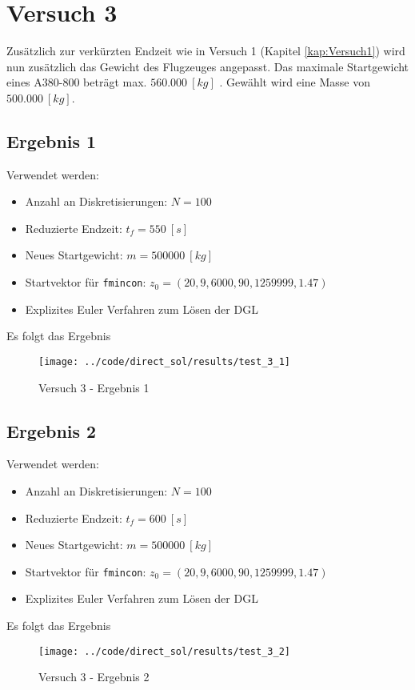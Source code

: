 \newpage
\section{Versuch 3}\label{kap:Versuch3}
Zusätzlich zur verkürzten Endzeit wie in Versuch 1 (Kapitel \ref{kap:Versuch1}) wird nun zusätzlich das Gewicht des Flugzeuges angepasst. Das maximale Startgewicht eines A380-800 beträgt max. $560.000 \ [kg]$ \cite{A380Tech}. Gewählt wird eine Masse von $500.000 \ [kg]$.

\subsection{Ergebnis 1}\label{kap:Versuch31}
Verwendet werden:
\begin{itemize}
\item Anzahl an Diskretisierungen: $N = 100$ 
\item Reduzierte Endzeit: $t_f = 550 \ [s]$
\item Neues Startgewicht: $m = 500000 \ [kg]$
\item Startvektor für \texttt{fmincon}: $z_0 = (20,9,6000,90,1259999,1.47)$
\item Explizites Euler Verfahren zum Lösen der DGL
\end{itemize}
Es folgt das Ergebnis
\begin{figure}[H]
\begin{center}
\texttt{[image: ../code/direct\_sol/results/test\_3\_1]}
\caption{Versuch 3 - Ergebnis 1}\label{img:test_3_1}
\end{center}
\end{figure}

\newpage
\subsection{Ergebnis 2}\label{kap:Versuch32}
Verwendet werden:
\begin{itemize}
\item Anzahl an Diskretisierungen: $N = 100$ 
\item Reduzierte Endzeit: $t_f = 600 \ [s]$
\item Neues Startgewicht: $m = 500000 \ [kg]$
\item Startvektor für \texttt{fmincon}: $z_0 = (20,9,6000,90,1259999,1.47)$
\item Explizites Euler Verfahren zum Lösen der DGL
\end{itemize}
Es folgt das Ergebnis
\begin{figure}[H]
\begin{center}
\texttt{[image: ../code/direct\_sol/results/test\_3\_2]}
\caption{Versuch 3 - Ergebnis 2}\label{img:test_3_2}
\end{center}
\end{figure}

